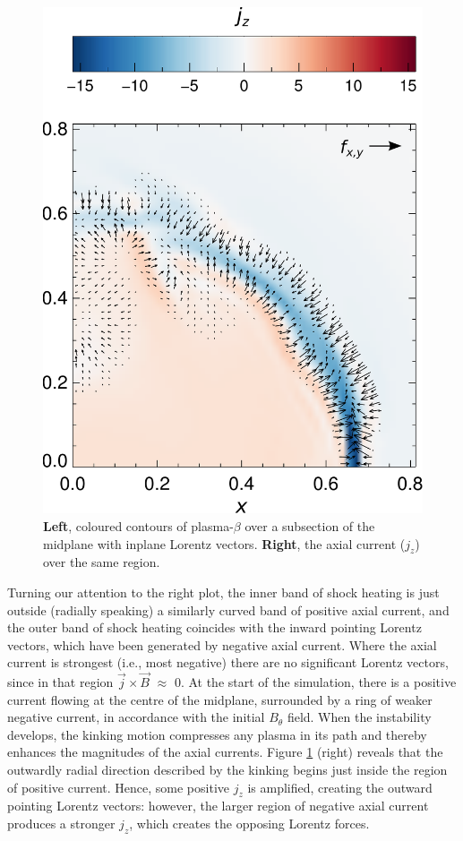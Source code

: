 \documentclass{./packages/rs/rsproca}
\begin{document}
\begin{figure}[h!]
  \includegraphics[scale=0.35]{./inkscape/256x256x512/jz_sca_rf_vec}
  \caption{\small{\textbf{Left}, coloured contours of plasma-$\beta$ over a subsection of the midplane with inplane Lorentz vectors. \textbf{Right}, the axial current ($j_z$) over the same region.}}
  \label{plasmab_and_jz}
  \vspace{-10pt}
\end{figure}
Turning our attention to the right plot, the inner band of shock heating is just outside (radially speaking) a similarly curved band of positive axial current, and the outer band of shock heating coincides with the inward pointing Lorentz vectors, which have been generated by negative axial current. Where the axial current is strongest (i.e., most negative) there are no significant Lorentz vectors, since in that region $\vec{j}\times\vec{B}\,\,{\approx}\,\,0$. At the start of the simulation, there is a positive current flowing at the centre of the midplane, surrounded by a ring of weaker negative current, in accordance with the initial $B_{\theta}$ field. When the instability develops, the kinking motion compresses any plasma in its path and thereby enhances the magnitudes of the axial currents. Figure \ref{plasmab_and_jz} (right) reveals that the outwardly radial direction described by the kinking begins just inside the region of positive current. Hence, some positive $j_z$ is amplified, creating the outward pointing Lorentz vectors: however, the larger region of negative axial current produces a stronger $j_z$, which creates the opposing Lorentz forces.
\end{document}
